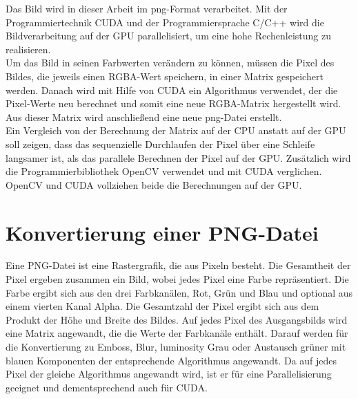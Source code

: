 \documentclass{llncs}
\begin{document}
Das Bild wird in dieser Arbeit im png-Format verarbeitet. Mit der Programmiertechnik CUDA und der Programmiersprache C/C++ wird die Bildverarbeitung auf der GPU parallelisiert, um eine hohe Rechenleistung zu realisieren.\\

Um das Bild in seinen Farbwerten verändern zu können, müssen die Pixel des Bildes, die jeweils einen RGBA-Wert speichern, in einer Matrix gespeichert werden. Danach wird mit Hilfe von CUDA ein Algorithmus verwendet, der die Pixel-Werte neu berechnet und somit eine neue RGBA-Matrix hergestellt wird. Aus dieser Matrix wird anschließend eine neue png-Datei erstellt.\\

Ein Vergleich von der Berechnung der Matrix auf der CPU anstatt auf der GPU soll zeigen, dass das sequenzielle Durchlaufen der Pixel über eine Schleife langsamer ist, als das parallele Berechnen der Pixel auf der GPU. Zusätzlich wird die Programmierbibliothek OpenCV verwendet und mit CUDA verglichen. OpenCV und CUDA vollziehen beide die Berechnungen auf der GPU.\\

%
\section{Konvertierung einer PNG-Datei}
%

Eine PNG-Datei ist eine Rastergrafik, die aus Pixeln besteht. Die Gesamtheit der Pixel ergeben zusammen ein Bild, wobei jedes Pixel eine Farbe repräsentiert. Die Farbe ergibt sich aus den drei Farbkanälen, Rot, Grün und Blau und optional aus einem vierten Kanal Alpha. Die Gesamtzahl der Pixel ergibt sich aus dem Produkt der Höhe und Breite des Bildes. Auf jedes Pixel des Ausgangsbilds wird eine Matrix angewandt, die die Werte der Farbkanäle enthält. Darauf werden für die Konvertierung zu Emboss, Blur, luminosity Grau oder Austausch grüner mit blauen Komponenten der entsprechende Algorithmus angewandt. Da auf jedes Pixel der gleiche Algorithmus angewandt wird, ist er für eine Parallelisierung geeignet und dementsprechend auch für CUDA.\\
\end{document}
